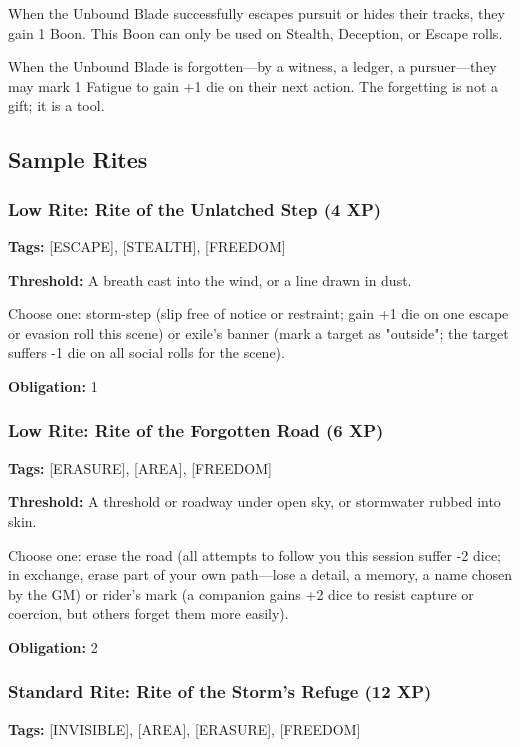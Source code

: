 When the Unbound Blade successfully escapes pursuit or hides their tracks, they gain 1 Boon. This Boon can only be used on Stealth, Deception, or Escape rolls.

When the Unbound Blade is forgotten—by a witness, a ledger, a pursuer—they may mark 1 Fatigue to gain +1 die on their next action. The forgetting is not a gift; it is a tool.

\subsection{Sample Rites}

\subsubsection{Low Rite: Rite of the Unlatched Step (4 XP)}

\textbf{Tags:} [ESCAPE], [STEALTH], [FREEDOM]

\textbf{Threshold:} A breath cast into the wind, or a line drawn in dust.

Choose one: storm-step (slip free of notice or restraint; gain +1 die on one escape or evasion roll this scene) or exile's banner (mark a target as "outside"; the target suffers -1 die on all social rolls for the scene).

\textbf{Obligation:} 1

\subsubsection{Low Rite: Rite of the Forgotten Road (6 XP)}

\textbf{Tags:} [ERASURE], [AREA], [FREEDOM]

\textbf{Threshold:} A threshold or roadway under open sky, or stormwater rubbed into skin.

Choose one: erase the road (all attempts to follow you this session suffer -2 dice; in exchange, erase part of your own path—lose a detail, a memory, a name chosen by the GM) or rider's mark (a companion gains +2 dice to resist capture or coercion, but others forget them more easily).

\textbf{Obligation:} 2

\subsubsection{Standard Rite: Rite of the Storm's Refuge (12 XP)}

\textbf{Tags:} [INVISIBLE], [AREA], [ERASURE], [FREEDOM]

